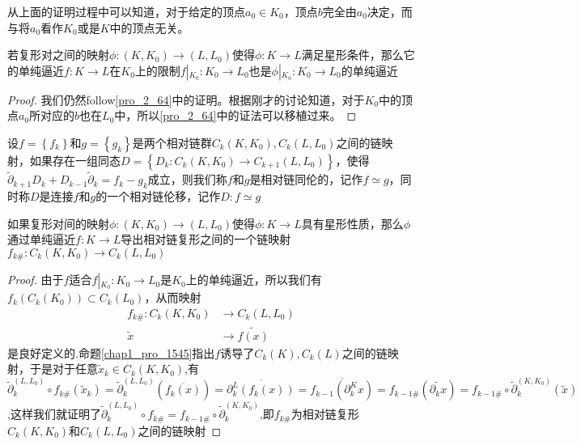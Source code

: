 从上面的证明过程中可以知道，对于给定的顶点$a_{0}\in K_{0}$，顶点$b$完全由$a_{0}$决定，而与将$a_{0}$看作$K_{0}$或是$K$中的顶点无关。
\begin{corollary}\label{chap3_cor_372}
若复形对之间的映射$\phi:(K,K_{0})\rightarrow (L,L_{0})$使得$\phi:K\rightarrow L$满足星形条件，那么它的单纯逼近$f:K\rightarrow L$在$K_{0}$上的限制$f\left|_{K_{0}}\right.:K_{0}\rightarrow L_{0}$也是$\phi\left|_{K_{0}}\right.:K_{0}\rightarrow L_{0}$的单纯逼近
\end{corollary}
\begin{proof}
我们仍然follow\eqref{pro_2_64}中的证明。根据刚才的讨论知道，对于$K_{0}$中的顶点$a_{0}$所对应的$b$也在$L_{0}$中，所以\eqref{pro_2_64}中的证法可以移植过来。
\end{proof}
\begin{definition}
设$f=\left\{f_{k}\right\}$和$g=\left\{g_{k}\right\}$是两个相对链群$C_{k}(K,K_{0}),C_{k}(L,L_{0})$之间的链映射，如果存在一组同态$D=\left\{D_{k}:C_{k}(K,K_{0})\rightarrow C_{k+1}(L,L_{0})\right\}$，使得$\tilde{\partial}_{k+1}D_{k}+D_{k-1}\tilde{\partial}_{k}=f_{k}-g_{k}$成立，则我们称$f$和$g$是相对链同伦的，记作$f\simeq g$，同时称$D$是连接$f$和$g$的一个相对链伦移，记作$D:f\simeq g$
\end{definition}
\begin{proposition}\label{chap3_pro_381}
如果复形对间的映射$\phi:(K,K_{0})\rightarrow (L,L_{0})$使得$\phi:K\rightarrow L$具有星形性质，那么$\phi$通过单纯逼近$f:K\rightarrow L$导出相对链复形之间的一个链映射$f_{k\#}:C_{k}(K,K_{0})\rightarrow C_{k}(L,L_{0})$
\end{proposition}
\begin{proof}
由于$f$适合$f\left|_{K_{0}}\right.:K_{0}\rightarrow L_{0}$是$K_{0}$上的单纯逼近，所以我们有$f_{k}(C_{k}(K_{0}))\subset C_{k}(L_{0})$，从而映射
\begin{equation*}
    \begin{aligned}
    f_{k\#}:C_{k}(K,K_{0})&\rightarrow C_{k}(L,L_{0})\\
            \tilde{x}&\rightarrow \widetilde{f(x)}
    \end{aligned}
\end{equation*}
是良好定义的.命题\eqref{chap1_pro_1545}指出$f$诱导了$C_{k}(K),C_{k}(L)$之间的链映射，于是对于任意$\tilde{x}_{k}\in C_{k}(K,K_{0})$,有$\tilde{\partial}_{k}^{(L,L_{0})}\circ f_{k\#}(\tilde{x}_{k})=\tilde{\partial}_{k}^{(L,L_{0})}\left(\overline{f_{k}(x)}\right)=\overline{\partial^{L}_{k}(f_{k}(x))}=\overline{f_{k-1}(\partial^{K}_{k}x)}=f_{k-1\#}\left(\widetilde{\partial_{k}x}\right)=f_{k-1\#}\circ \tilde{\partial}^{(K,K_{0})}_{k}(\tilde{x})$,这样我们就证明了$\tilde{\partial}_{k}^{(L,L_{0})}\circ f_{k\#}=f_{k-1\#}\circ \tilde{\partial}^{(K,K_{0})}_{k}$,即$f_{k\#}$为相对链复形$C_{k}(K,K_{0})$和$C_{k}(L,L_{0})$之间的链映射
\end{proof}
